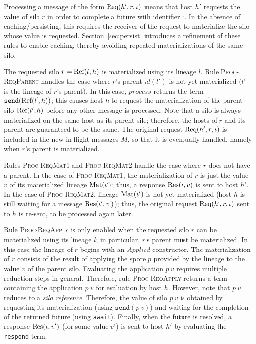 Processing a message of the form ${\textrm{Req}(h', r, \iota)}$ means that host
$h'$ requests the value of silo $r$ in order to complete a future with
identifier $\iota$. In the absence of caching/persisting, this
requires the receiver of the request to materialize the silo whose
value is requested. Section~\ref{sec:persist} introduces a refinement
of these rules to enable caching, thereby avoiding repeated
materializations of the same silo.



The requested silo $r = {\textrm{Ref}(l, h)}$ is materialized using its lineage
$l$. Rule \textsc{Proc-ReqParent} handles the case where $r$'s
parent $id(l')$ is not yet materialized ($l'$ is the lineage of $r$'s
parent). In this case, $\mathit{process}$ returns the term
$\texttt{send}({\textrm{Ref}(l', h)})$; this causes host $h$ to request the
materialization of the parent silo ${\textrm{Ref}(l', h)}$ before any other
message is processed. Note that a silo is always materialized on the
same host as its parent silo; therefore, the hosts of $r$ and its
parent are guaranteed to be the same. The original request ${\textrm{Req}(h', r, \iota)}$ is included in the new in-flight messages $M$, so that it
is eventually handled, namely when $r$'s parent is materialized.

Rules \textsc{Proc-ReqMat1} and \textsc{Proc-ReqMat2} handle the case
where $r$ does not have a parent. In the case of
\textsc{Proc-ReqMat1}, the materialization of $r$ is just the value
$v$ of its materialized lineage ${\textrm{Mat}(\iota')}$; thus, a response
${\textrm{Res}(\iota, v)}$ is sent to host $h'$.  In the case of
\textsc{Proc-ReqMat2}, lineage ${\textrm{Mat}(\iota')}$ is not yet
materialized (\ie host $h$ is still waiting for a message ${\textrm{Res}(\iota', v')}$); thus, the original request ${\textrm{Req}(h', r, \iota)}$
sent to $h$ is re-sent, to be processed again later.

Rule \textsc{Proc-ReqApply} is only enabled when the requested silo $r$
can be materialized using its lineage $l$; in particular, $r$'s parent
must be materialized. In this case the lineage of $r$ begins with an
$\mathit{Applied}$ constructor. The materialization of $r$ consists of
the result of applying the spore $p$ provided by the lineage to the
value $v$ of the parent silo. Evaluating the application $p~v$
requires multiple reduction steps in general. Therefore, rule
\textsc{Proc-ReqApply} returns a term containing the application $p~v$
for evaluation by host $h$. However, note that $p~v$ reduces to a {\em
  silo reference}. Therefore, the value of silo $p~v$ is obtained by
requesting its materialization (using $\texttt{send}(p~v)$) and
waiting for the completion of the returned future (using
\verb|await|). Finally, when the future is resolved, a response ${\textrm{Res}(\iota, v')}$ (for some value $v'$) is sent to host $h'$ by
evaluating the \texttt{respond} term.


